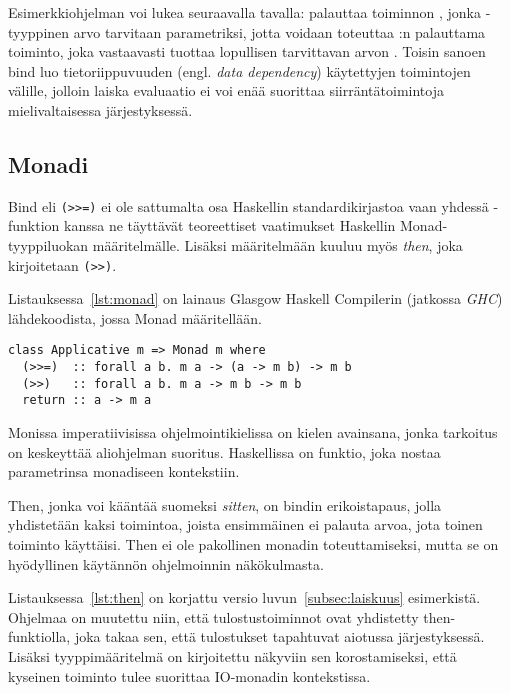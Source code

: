 \documentclass[finnish]{tktltiki2}
\begin{document}
Esimerkkiohjelman voi lukea seuraavalla tavalla:  palauttaa toiminnon ,
jonka -tyyppinen arvo tarvitaan parametriksi, jotta voidaan toteuttaa :n
palauttama toiminto, joka vastaavasti tuottaa lopullisen tarvittavan arvon . Toisin
sanoen bind luo tietoriippuvuuden (engl. \emph{data dependency}) käytettyjen toimintojen välille,
jolloin laiska evaluaatio ei voi enää suorittaa siirräntätoimintoja mielivaltaisessa järjestyksessä.

\subsection{Monadi}

Bind eli \verb|(>>=)| ei ole sattumalta osa Haskellin standardikirjastoa vaan yhdessä
-funktion kanssa ne täyttävät teoreettiset vaatimukset Haskellin Monad-tyyppiluokan
määritelmälle. Lisäksi määritelmään kuuluu myös \emph{then}, joka kirjoitetaan \verb|(>>)|.

Listauksessa~\ref{lst:monad} on lainaus Glasgow Haskell Compilerin (jatkossa \emph{GHC})
lähdekoodista, jossa Monad määritellään. 

\begin{lstlisting}[float,float,label={lst:monad},caption={Monad-tyyppiluokka}]
class Applicative m => Monad m where
  (>>=)  :: forall a b. m a -> (a -> m b) -> m b
  (>>)   :: forall a b. m a -> m b -> m b
  return :: a -> m a
\end{lstlisting}

Monissa imperatiivisissa ohjelmointikielissa  on kielen avainsana, jonka tarkoitus on
keskeyttää aliohjelman suoritus. Haskellissa  on funktio, joka nostaa parametrinsa
monadiseen kontekstiin. 

Then, jonka voi kääntää suomeksi \emph{sitten}, on bindin erikoistapaus, jolla yhdistetään kaksi
toimintoa, joista ensimmäinen ei palauta arvoa, jota toinen toiminto käyttäisi. Then ei ole
pakollinen monadin toteuttamiseksi, mutta se on hyödyllinen käytännön ohjelmoinnin näkökulmasta.

Listauksessa~\ref{lst:then} on korjattu versio luvun~\ref{subsec:laiskuus} esimerkistä. Ohjelmaa on
muutettu niin, että tulostustoiminnot ovat yhdistetty then-funktiolla, joka takaa sen, että
tulostukset tapahtuvat aiotussa järjestyksessä. Lisäksi tyyppimääritelmä on kirjoitettu näkyviin sen
korostamiseksi, että kyseinen toiminto tulee suorittaa IO-monadin kontekstissa.
\end{document}
